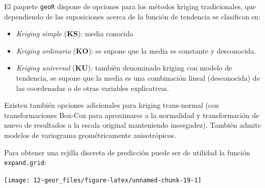 \documentclass[
  spanish,
]{book}
\newenvironment{Shaded}{\begin{snugshade}}{\end{snugshade}}
\newcommand{\AttributeTok}[1]{\textcolor[rgb]{0.77,0.63,0.00}{#1}}
\newcommand{\CommentTok}[1]{\textcolor[rgb]{0.56,0.35,0.01}{\textit{#1}}}
\newcommand{\DecValTok}[1]{\textcolor[rgb]{0.00,0.00,0.81}{#1}}
\newcommand{\FloatTok}[1]{\textcolor[rgb]{0.00,0.00,0.81}{#1}}
\newcommand{\FunctionTok}[1]{\textcolor[rgb]{0.00,0.00,0.00}{#1}}
\newcommand{\NormalTok}[1]{#1}
\newcommand{\OtherTok}[1]{\textcolor[rgb]{0.56,0.35,0.01}{#1}}
\newcommand{\SpecialCharTok}[1]{\textcolor[rgb]{0.00,0.00,0.00}{#1}}
\theoremstyle{break}
\theoremstyle{definition}
\theoremstyle{definition}
\theoremstyle{definition}
\theoremstyle{definition}
\theoremstyle{remark}
\begin{document}
El paquete \texttt{geoR} dispone de opciones para los métodos kriging
tradicionales, que dependiendo de las suposiciones acerca de la función
de tendencia se clasifican en:

\begin{itemize}
\item
  \emph{Kriging simple} (\textbf{KS}): media conocida
\item
  \emph{Kriging ordinario} (\textbf{KO}): se supone que la media es constante
  y desconocida.
\item
  \emph{Kriging universal} (\textbf{KU}): también denominado kriging con modelo de
  tendencia, se supone que la media es una combinación
  lineal (desconocida) de las coordenadas o de otras
  variables explicativas.
\end{itemize}

Existen también opciones adicionales para kriging trans-normal (con
transformaciones Box-Cox para aproximarse a la normalidad y
transformación de nuevo de resultados a la escala original manteniendo
insesgadez). También admite modelos de variograma geométricamente
anisotrópicos.

Para obtener una rejilla discreta de predicción puede ser de utilidad la
función \texttt{expand.grid}:

\begin{Shaded}
\end{Shaded}

\begin{center}\texttt{[image: 12-geor\_files/figure-latex/unnamed-chunk-19-1]} \end{center}
\end{document}
